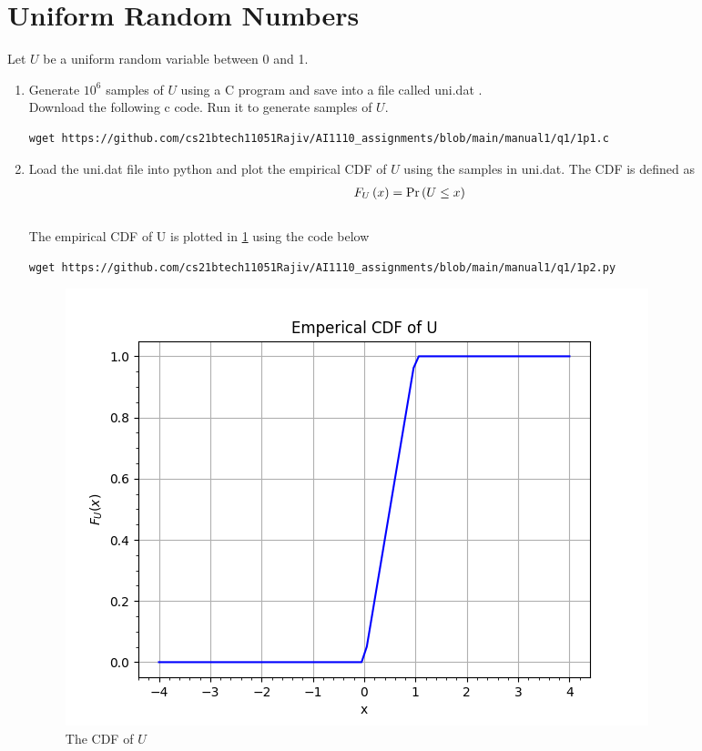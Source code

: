 \documentclass[journal,12pt,twocolumn]{IEEEtran}
\renewcommand\thesection{\arabic{section}}
\begin{document}
\section{Uniform Random Numbers}
Let $U$ be a uniform random variable between 0 and 1.
\begin{enumerate}[label=\thesection.\arabic*
,ref=\thesection.\theenumi]
\item Generate $10^6$ samples of $U$ using a C program and save into a file called uni.dat .
\\
\solution Download the following c code. Run it to generate samples of $U$.
\begin{lstlisting}
wget https://github.com/cs21btech11051Rajiv/AI1110_assignments/blob/main/manual1/q1/1p1.c
\end{lstlisting}
%
\item
Load the uni.dat file into python and plot the empirical CDF of $U$ using the samples in uni.dat. The CDF is defined as
\begin{align}
    F_{U}\left(x\right) = \Pr\left(U \le x\right)
\end{align}
\\
\solution The empirical CDF of U is plotted in \ref{fig:uni_cdf}
using the code below
\begin{lstlisting}
wget https://github.com/cs21btech11051Rajiv/AI1110_assignments/blob/main/manual1/q1/1p2.py
\end{lstlisting}
\begin{figure}[ht!]
    \centering
    \includegraphics[width=\columnwidth]{./figs/fig1.2.png}
    \caption{The CDF of $U$}
    \label{fig:uni_cdf}
\end{figure}

\end{enumerate}
\end{document}
